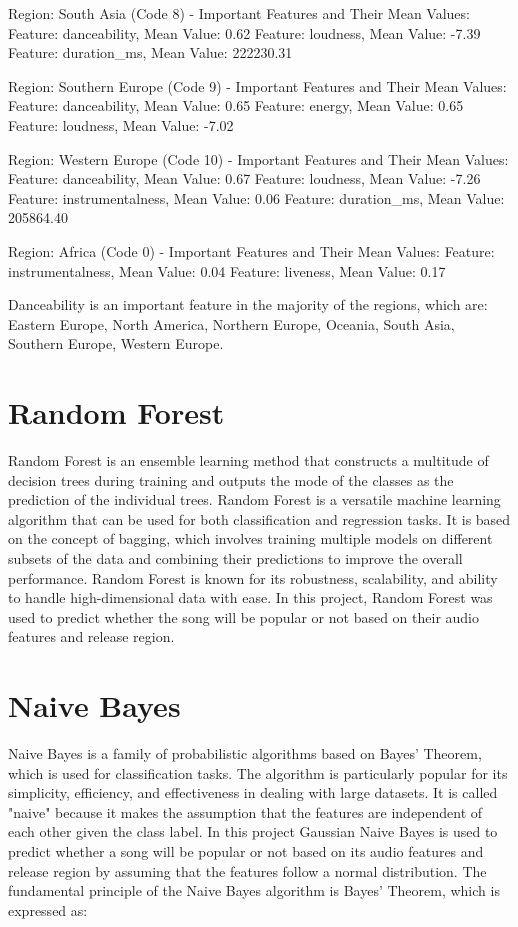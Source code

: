 Region: South Asia (Code 8) - Important Features and Their Mean Values:
Feature: danceability, Mean Value: 0.62
Feature: loudness, Mean Value: -7.39
Feature: duration\_ms, Mean Value: 222230.31

Region: Southern Europe (Code 9) - Important Features and Their Mean Values:
Feature: danceability, Mean Value: 0.65
Feature: energy, Mean Value: 0.65
Feature: loudness, Mean Value: -7.02

Region: Western Europe (Code 10) - Important Features and Their Mean Values:
Feature: danceability, Mean Value: 0.67
Feature: loudness, Mean Value: -7.26
Feature: instrumentalness, Mean Value: 0.06
Feature: duration\_ms, Mean Value: 205864.40

Region: Africa (Code 0) - Important Features and Their Mean Values:
Feature: instrumentalness, Mean Value: 0.04
Feature: liveness, Mean Value: 0.17


Danceability is an important feature in the majority of the regions, which are: Eastern Europe, North America, Northern Europe, Oceania, South Asia, Southern Europe, Western Europe.


\newpage

\section{Random Forest}
Random Forest is an ensemble learning method that constructs a multitude of decision trees during
training and outputs the mode of the classes as the prediction of the individual trees. Random Forest
is a versatile machine learning algorithm that can be used for both classification and regression
tasks. It is based on the concept of bagging, which involves training multiple models on different
subsets of the data and combining their predictions to improve the overall performance. Random Forest
is known for its robustness, scalability, and ability to handle high-dimensional data with ease.
In this project, Random Forest was used to predict whether the song will be popular or not based on their audio
features and release region. \\


\newpage

\section{Naive Bayes}
Naive Bayes is a family of probabilistic algorithms based on Bayes' Theorem, which is used for classification tasks.
The algorithm is particularly popular for its simplicity, efficiency, and effectiveness in dealing with large datasets.
It is called "naive" because it makes the assumption that the features are independent of each other given the class label.
In this project Gaussian Naive Bayes is used to predict whether a song will be popular or not based on its audio features and release region by assuming that
the features follow a normal distribution. The fundamental principle of the Naive Bayes algorithm is Bayes' Theorem, which is expressed as:

